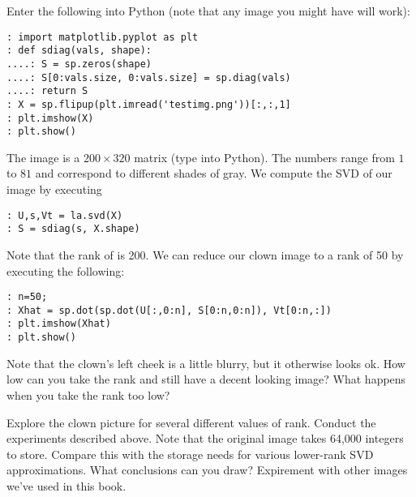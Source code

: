 \begin{python}
Enter the following into Python (note that any image you might have will work):
\begin{lstlisting}
: import matplotlib.pyplot as plt
: def sdiag(vals, shape):
....: S = sp.zeros(shape)
....: S[0:vals.size, 0:vals.size] = sp.diag(vals)
....: return S
: X = sp.flipup(plt.imread('testimg.png'))[:,:,1]
: plt.imshow(X)
: plt.show()
\end{lstlisting}
The image  is a $200\times 320$ matrix (type 
into Python).  The numbers range from $1$ to $81$ and
correspond to different shades of gray.  We compute the SVD of our
image  by executing
\begin{lstlisting}
: U,s,Vt = la.svd(X)
: S = sdiag(s, X.shape)
\end{lstlisting}
Note that the rank of  is 200.  We can reduce our clown image
to a rank of 50 by executing the following:
\begin{lstlisting}
: n=50;
: Xhat = sp.dot(sp.dot(U[:,0:n], S[0:n,0:n]), Vt[0:n,:])
: plt.imshow(Xhat)
: plt.show()
\end{lstlisting}
Note that the clown's left cheek is a little blurry, but it
otherwise looks ok.  How low can you take the rank and still have a
decent looking image?  What happens when you take the rank too low?

\begin{problem}
Explore the clown picture for several different values of rank.
Conduct the experiments described above.  Note that the original
image takes 64,000 integers to store.  Compare this with the storage
needs for various lower-rank SVD approximations. What conclusions
can you draw? Expirement with other images we've used in this book.
\end{problem}
\end{python}
